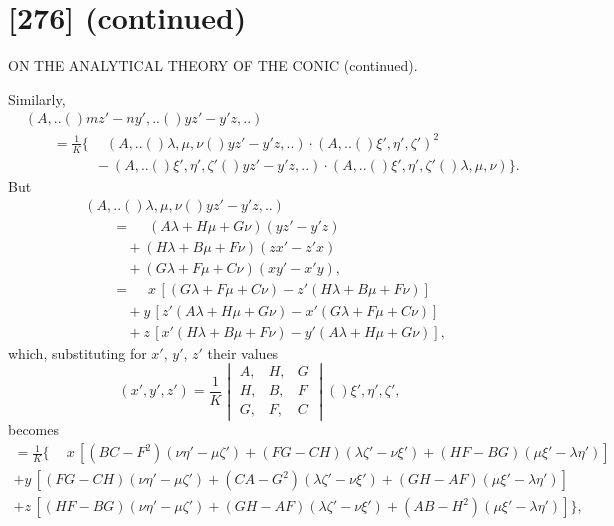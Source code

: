 \documentclass[11pt,a4paper]{book}
\providecommand{\qform}[1]{(#1)}
\begin{document}
\newpage
\section*{[276] (continued)}
\begin{center}
{\large ON THE ANALYTICAL THEORY OF THE CONIC (continued).}
\end{center}

Similarly,
\begin{align*}
&(A,..\!\qform{}{mz' - ny',..}\!\qform{}{yz' - y'z,..})\\
&\qquad = \frac{1}{K}\Big\{\phantom{-}(A,..\!\qform{}{\lambda, \mu, \nu}\!\qform{}{yz' - y'z,..}) \cdot (A,..\!\qform{}{\xi', \eta', \zeta'})^{2}\\
&\qquad\qquad\quad - (A,..\!\qform{}{\xi', \eta', \zeta'}\!\qform{}{yz' - y'z,..}) \cdot (A,..\!\qform{}{\xi', \eta', \zeta'}\!\qform{}{\lambda, \mu, \nu}) \Big\}.
\end{align*}
But
\begin{align*}
&(A,..\!\qform{}{\lambda, \mu, \nu}\!\qform{}{yz' - y'z,..})\\
&\qquad = \phantom{+} (A\lambda + H\mu + G\nu)(yz' - y'z)\\
&\qquad\quad + (H\lambda + B\mu + F\nu)(zx' - z'x)\\
&\qquad\quad + (G\lambda + F\mu + C\nu)(xy' - x'y),\\
&\qquad = \phantom{+} x\,[(G\lambda + F\mu + C\nu) - z'(H\lambda + B\mu + F\nu)]\\
&\qquad\quad + y\,[z'(A\lambda + H\mu + G\nu) - x'(G\lambda + F\mu + C\nu)]\\
&\qquad\quad + z\,[x'(H\lambda + B\mu + F\nu) - y'(A\lambda + H\mu + G\nu)],
\end{align*}
which, substituting for $x'$, $y'$, $z'$ their values
\[
(x', y', z') = \frac{1}{K}
\begin{vmatrix}
A, & H, & G \\
H, & B, & F \\
G, & F, & C
\end{vmatrix}
\!\qform{}{\xi', \eta', \zeta'},
\]
becomes
\begin{multline*}
= \frac{1}{K}\Big\{\phantom{+} x\,[(BC - F^{2})(\nu\eta' - \mu\zeta') + (FG - CH)(\lambda\zeta' - \nu\xi') + (HF - BG)(\mu\xi' - \lambda\eta')]\\
+ y\,[(FG - CH)(\nu\eta' - \mu\zeta') + (CA - G^{2})(\lambda\zeta' - \nu\xi') + (GH - AF)(\mu\xi' - \lambda\eta')]\\
+ z\,[(HF - BG)(\nu\eta' - \mu\zeta') + (GH - AF)(\lambda\zeta' - \nu\xi') + (AB - H^{2})(\mu\xi' - \lambda\eta')]\Big\},
\end{multline*}
\end{document}
